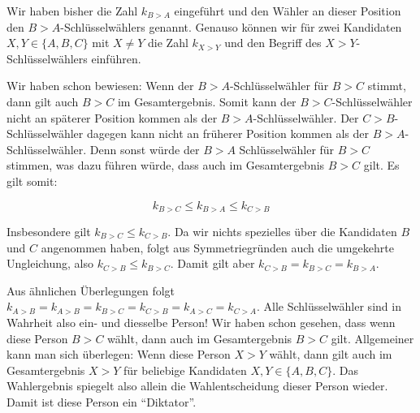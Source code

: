 \documentclass[a4paper,ngerman,12pt]{scrartcl}
\theoremstyle{definition}
\begin{document}
\begin{antw}
  Wir haben bisher die Zahl $k_{B>A}$ eingeführt und den Wähler an dieser Position den $B{>}A$-Schlüsselwählers genannt. Genauso können wir für zwei Kandidaten $X, Y \in \{ A, B, C \}$ mit $X \not= Y$ die Zahl $k_{X>Y}$ und den Begriff des $X{>}Y$-Schlüsselwählers einführen.

  Wir haben schon bewiesen: Wenn der $B{>}A$-Schlüsselwähler für $B>C$ stimmt, dann gilt auch $B>C$ im Gesamtergebnis. Somit kann der $B{>}C$-Schlüsselwähler nicht an späterer Position kommen als der $B{>}A$-Schlüsselwähler. Der $C{>}B$-Schlüsselwähler dagegen kann nicht an früherer Position kommen als der $B{>}A$-Schlüsselwähler. Denn sonst würde der $B{>}A$ Schlüsselwähler für $B{>}C$ stimmen, was dazu führen würde, dass auch im Gesamtergebnis $B{>}C$ gilt. Es gilt somit:

  \[ k_{B>C} \leq k_{B>A} \leq k_{C>B} \]

  Insbesondere gilt $k_{B>C} \leq k_{C>B}$. Da wir nichts spezielles über die Kandidaten $B$ und $C$ angenommen haben, folgt aus Symmetriegründen auch die umgekehrte Ungleichung, also $k_{C>B} \leq k_{B>C}$. Damit gilt aber $k_{C>B} = k_{B>C} = k_{B>A}$.

  Aus ähnlichen Überlegungen folgt $k_{A{>}B} = k_{A{>}B} = k_{B{>}C} = k_{C{>}B} = k_{A{>}C} = k_{C{>}A}$. Alle Schlüsselwähler sind in Wahrheit also ein- und diesselbe Person! Wir haben schon gesehen, dass wenn diese Person $B > C$ wählt, dann auch im Gesamtergebnis $B > C$ gilt. Allgemeiner kann man sich überlegen: Wenn diese Person $X > Y$ wählt, dann gilt auch im Gesamtergebnis $X > Y$ für beliebige Kandidaten $X, Y \in \{ A, B, C \}$. Das Wahlergebnis spiegelt also allein die Wahlentscheidung dieser Person wieder. Damit ist diese Person ein "`Diktator"'.
\end{antw}
\end{document}
